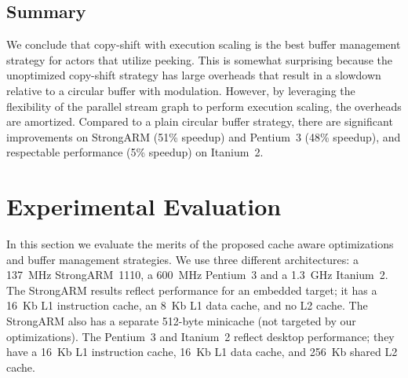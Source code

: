\documentclass{sigplanconf}
\begin{document}
\subsection{Summary}

We conclude that copy-shift with execution scaling is the best buffer
management strategy for actors that utilize peeking.  This is somewhat
surprising because the unoptimized copy-shift strategy has large
overheads that result in a slowdown relative to a circular buffer with
modulation.  However, by leveraging the flexibility of the parallel
stream graph to perform execution scaling, the overheads are
amortized.  Compared to a plain circular buffer strategy, there are
significant improvements on StrongARM (51\% speedup) and Pentium~3
(48\% speedup), and respectable performance (5\% speedup) on
Itanium~2.






\section{Experimental Evaluation}
\label{sec:evaluation}

In this section we evaluate the merits of the proposed cache aware
optimizations and buffer management strategies.  We use three
different architectures: a 137~MHz StrongARM~1110, a 600~MHz Pentium~3
and a 1.3~GHz Itanium~2. The StrongARM results reflect performance for
an embedded target; it has a 16~Kb L1 instruction cache, an 8~Kb L1 data
cache, and no L2 cache.  The StrongARM also has a separate 512-byte
minicache (not targeted by our optimizations).  The Pentium~3 and
Itanium~2 reflect desktop performance; they have a 16~Kb L1 instruction
cache, 16~Kb L1 data cache, and 256~Kb shared L2 cache.
\end{document}
